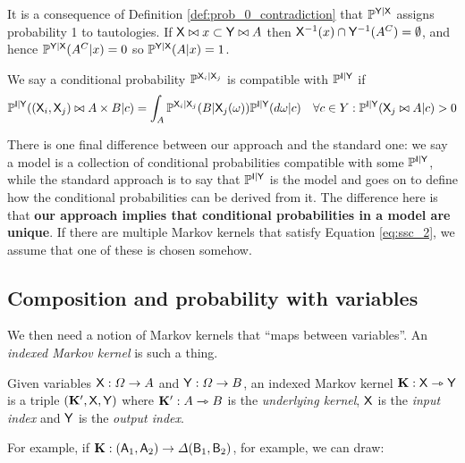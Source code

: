 It is a consequence of Definition \ref{def:prob_0_contradiction} that $\mathbb{P}^{\mathsf{Y}|\mathsf{X}}$ assigns probability 1 to tautologies. If $\mathsf{X}\bowtie x\subset \mathsf{Y}\bowtie A$ then $\mathsf{X}^{-1}(x)\cap \mathsf{Y}^{-1}(A^C) = \emptyset$, and hence $\mathbb{P}^{\mathsf{Y}|\mathsf{X}}(A^C|x) = 0$ so $\mathbb{P}^{\mathsf{Y}|\mathsf{X}}(A|x) = 1$.

\begin{definition}\label{def:compat_master}
We say a conditional probability $\mathbb{P}^{\mathsf{X}_i|\mathsf{X}_j}$ is compatible with $\mathbb{P}^{\mathsf{I}|\mathsf{Y}}$ if
\begin{align}
	\mathbb{P}^{\mathsf{I}|\mathsf{Y}}((\mathsf{X}_i,\mathsf{X}_j)\bowtie A\times B|c) &= \int_A \mathbb{P}^{\mathsf{X}_{i}|\mathsf{X}_j}(B|\mathsf{X}_j(\omega))\mathbb{P}^{\mathsf{I}|\mathsf{Y}}(d\omega|c) &\forall c\in Y:\mathbb{P}^{\mathsf{I}|\mathsf{Y}}(\mathsf{X}_j\bowtie A|c)>0 \label{eq:ssc_2}
\end{align}
\end{definition}

There is one final difference between our approach and the standard one: we say a model is a collection of conditional probabilities compatible with some $\mathbb{P}^{\mathsf{I}|\mathsf{Y}}$, while the standard approach is to say that $\mathbb{P}^{\mathsf{I}|\mathsf{Y}}$ is the model and goes on to define how the conditional probabilities can be derived from it. The difference here is that \textbf{our approach implies that conditional probabilities in a model are unique}. If there are multiple Markov kernels that satisfy Equation \ref{eq:ssc_2}, we assume that one of these is chosen somehow. 


\subsection{Composition and probability with variables}

We then need a notion of Markov kernels that ``maps between variables''. An \emph{indexed Markov kernel} is such a thing.

\begin{definition}
Given variables $\mathsf{X}:\Omega\to A$ and $\mathsf{Y}:\Omega\to B$, an indexed Markov kernel $\mathbf{K}:\mathsf{X}\rightarrowtriangle \mathsf{Y}$ is a triple $(\mathbf{K}',\mathsf{X},\mathsf{Y})$ where $\mathbf{K}':A\rightarrowtriangle B$ is the \emph{underlying kernel}, $\mathsf{X}$ is the \emph{input index} and $\mathsf{Y}$ is the \emph{output index}.
\end{definition}

For example, if $\mathbf{K}:(\mathsf{A}_1,\mathsf{A}_2)\to \Delta(\mathsf{B}_1,\mathsf{B}_2)$, for example, we can draw:

